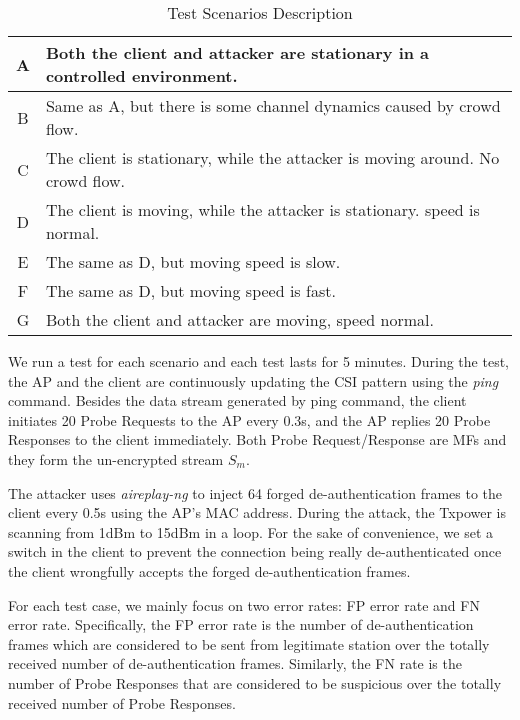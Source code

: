 \documentclass[conference]{IEEEtran}
\begin{document}
\begin{table}[!h]
\caption{ Test Scenarios Description}
\label{tab:scenarios}
\begin{center}
\begin{tabular}{|c|p{6.5cm}|}
\hline
A & Both the client and attacker are stationary in a controlled environment.\\ \hline
B & Same as A, but there is some channel dynamics caused by crowd flow.  \\ \hline
C & The client is stationary, while the attacker is moving around. No crowd flow. \\ \hline
D & The client is moving, while the attacker is stationary. speed is normal. \\ \hline
E & The same as D, but moving speed is slow. \\ \hline
F & The same as D, but moving speed is fast.\\ \hline
G & Both the client and attacker are moving, speed normal. \\ \hline
\end{tabular}
\end{center}
\end{table}

We run a test for each scenario and each test lasts for 5 minutes. During the test, the AP and the client are continuously updating the CSI pattern using the \textit{ping} command. Besides the data stream generated by ping command, the client initiates 20 Probe Requests to the AP every 0.3s, and the AP replies 20 Probe Responses to the client immediately. Both Probe Request/Response are MFs and they form the un-encrypted stream $S_{m}$.

The attacker uses \textit{aireplay-ng} to inject 64 forged de-authentication frames to the client every 0.5s using the AP's MAC address. During the attack, the Txpower is scanning from 1dBm to 15dBm in a loop. For the sake of convenience, we set a switch in the client to prevent the connection being really de-authenticated once the client wrongfully accepts the forged de-authentication frames.



For each test case, we mainly focus on two error rates: FP error rate and FN error rate. Specifically, the FP error rate is the number of de-authentication frames which are considered to be sent from legitimate station over the totally received number of de-authentication frames. Similarly, the FN rate is the number of Probe Responses that are considered to be suspicious over the totally received number of Probe Responses.
\end{document}
